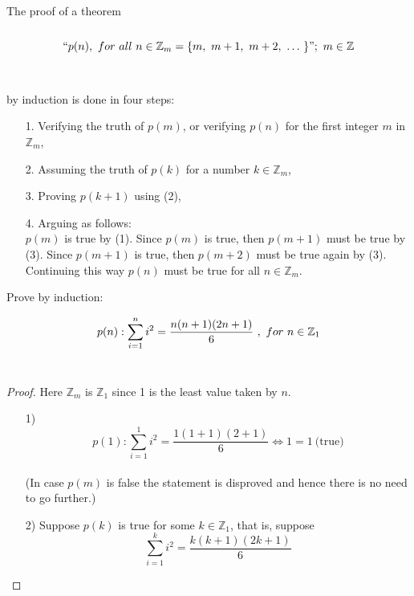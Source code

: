 \documentclass{amsbook}
\begin{document}

The proof of a theorem \\ \\
\begin{equation*}
	\text{\textquotedblleft} p(n), \ for \ all \ n \in \mathbb{Z}_m = \{ m, \ m + 1, \ m + 2, \  \dotso \  \} ";  \ m \in \mathbb{Z}
\end{equation*} \\ \\
by induction is done in four steps: \\
\begin{enumerate}
	\item [1.] Verifying the truth of $p(m)$, or verifying $p(n)$ for the first integer $m$ in $\mathbb{Z}_m$,
	
	\item [2.] Assuming the truth of $p(k)$ for a number $k \in \mathbb{Z}_m$,
	
	\item [3.] Proving $p(k + 1)$ using (2), 

	\item [4.] Arguing as follows: \\
	$p(m)$ is true by (1). Since $p(m)$ is true, then $p(m + 1)$ must be true by (3). Since $p(m + 1)$ is true, then 
	$p(m + 2)$ must be true again by (3). Continuing this way $p(n)$ must be true for all $n \in \mathbb{Z}_m$. \\
\end{enumerate}

\begin{exmp}
	Prove by induction:
\end{exmp}
\begin{equation*}
	p(n) : \sum_{i = 1} ^ {n} i ^ 2 = \frac{n(n + 1)(2n + 1)}{6} \ , \ for \ n \in \mathbb{Z}_1 \\
\end{equation*} \\
\begin{proof}
	Here $\mathbb{Z}_m$ is $\mathbb{Z}_1$ since 1 is the least value taken by $n$. \\
	\begin{enumerate}
		\item [1)]
			\begin{equation*}
				p(1) : \sum_{i = 1} ^ {1} i ^ 2 = \frac{1(1 + 1)(2 + 1)}{6} \iff 1 = 1 \ \text{(true)}
			\end{equation*} \\
			(In case $p(m)$ is false the statement is disproved and hence there is no need to go further.) \\
		\item [2)]
			Suppose $p(k)$ is true for some $k \in \mathbb{Z}_1$, that is, suppose \\
			\begin{equation*}
				\sum_{i = 1} ^ {k} i ^ 2 = \frac{k(k + 1)(2k + 1)}{6}
			\end{equation*}
	\end{enumerate}
\end{proof}
\end{document}
